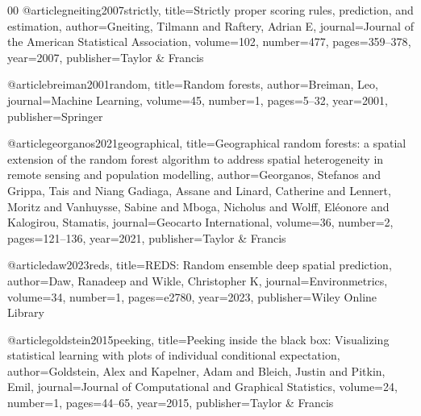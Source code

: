 \documentclass[preprint,12pt]{elsarticle}
\begin{document}
\begin{thebibliography}{00}
@article{gneiting2007strictly,
  title={Strictly proper scoring rules, prediction, and estimation},
  author={Gneiting, Tilmann and Raftery, Adrian E},
  journal={Journal of the American Statistical Association},
  volume={102},
  number={477},
  pages={359--378},
  year={2007},
  publisher={Taylor \& Francis}
}

@article{breiman2001random,
  title={Random forests},
  author={Breiman, Leo},
  journal={Machine Learning},
  volume={45},
  number={1},
  pages={5--32},
  year={2001},
  publisher={Springer}
}

@article{georganos2021geographical,
  title={Geographical random forests: a spatial extension of the random forest algorithm to address spatial heterogeneity in remote sensing and population modelling},
  author={Georganos, Stefanos and Grippa, Tais and Niang Gadiaga, Assane and Linard, Catherine and Lennert, Moritz and Vanhuysse, Sabine and Mboga, Nicholus and Wolff, El{\'e}onore and Kalogirou, Stamatis},
  journal={Geocarto International},
  volume={36},
  number={2},
  pages={121--136},
  year={2021},
  publisher={Taylor \& Francis}
}

@article{daw2023reds,
  title={{REDS: Random ensemble deep spatial prediction}},
  author={Daw, Ranadeep and Wikle, Christopher K},
  journal={Environmetrics},
  volume={34},
  number={1},
  pages={e2780},
  year={2023},
  publisher={Wiley Online Library}
}



@article{goldstein2015peeking,
  title={{Peeking inside the black box: Visualizing statistical learning with plots of individual conditional expectation}},
  author={Goldstein, Alex and Kapelner, Adam and Bleich, Justin and Pitkin, Emil},
  journal={Journal of Computational and Graphical Statistics},
  volume={24},
  number={1},
  pages={44--65},
  year={2015},
  publisher={Taylor \& Francis}
}




\end{thebibliography}
\end{document}
